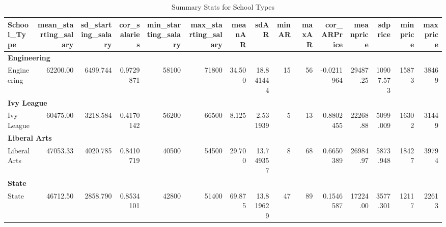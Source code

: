 \documentclass[]{article}
\newenvironment{Shaded}{\begin{snugshade}}{\end{snugshade}}
\newcommand{\KeywordTok}[1]{\textcolor[rgb]{0.13,0.29,0.53}{\textbf{#1}}}
\newcommand{\StringTok}[1]{\textcolor[rgb]{0.31,0.60,0.02}{#1}}
\newcommand{\OperatorTok}[1]{\textcolor[rgb]{0.81,0.36,0.00}{\textbf{#1}}}
\newcommand{\NormalTok}[1]{#1}
\begin{document}
\begin{table}

\caption{\label{tab:unnamed-chunk-3}Summary Stats for School Types}
\centering
\begin{tabular}[t]{l|r|r|r|r|r|r|r|r|r|r|r|r|r|r}
\hline
School\_Type & mean\_starting\_salary & sd\_starting\_salary & cor\_salaries & min\_starting\_salary & max\_starting\_salary & meanAR & sdAR & minAR & maxAR & cor\_ARPrice & meanprice & sdprice & minprice & maxprice\\
\hline
\multicolumn{15}{l}{\textbf{Engineering}}\\
\hline
\hspace{1em}Engineering & 62200.00 & 6499.744 & 0.9729871 & 58100 & 71800 & 34.500 & 18.841444 & 15 & 56 & -0.0211964 & 29487.25 & 10907.573 & 15873 & 38469\\
\hline
\multicolumn{15}{l}{\textbf{Ivy League}}\\
\hline
\hspace{1em}Ivy League & 60475.00 & 3218.584 & 0.4170142 & 56200 & 66500 & 8.125 & 2.531939 & 5 & 13 & 0.8802455 & 22268.88 & 5099.009 & 16302 & 31449\\
\hline
\multicolumn{15}{l}{\textbf{Liberal Arts}}\\
\hline
\hspace{1em}Liberal Arts & 47053.33 & 4020.785 & 0.8410719 & 40500 & 54500 & 29.700 & 13.749357 & 8 & 68 & 0.6650389 & 26984.97 & 5873.948 & 18427 & 39794\\
\hline
\multicolumn{15}{l}{\textbf{State}}\\
\hline
\hspace{1em}State & 46712.50 & 2858.790 & 0.8534101 & 42800 & 51400 & 69.875 & 13.819629 & 47 & 89 & 0.1546587 & 17224.00 & 3577.301 & 12117 & 22613\\
\hline
\end{tabular}
\end{table}

\begin{Shaded}
\end{Shaded}
\end{document}
